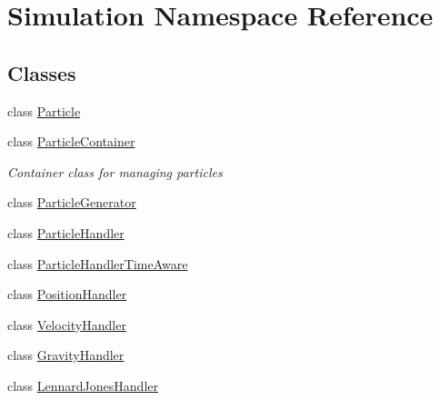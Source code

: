 \hypertarget{namespaceSimulation}{\section{Simulation Namespace Reference}
\label{namespaceSimulation}
}
\subsection*{Classes}
\begin{DoxyCompactItemize}
\item 
class \hyperlink{classSimulation_1_1Particle}{Particle}
\item 
class \hyperlink{classSimulation_1_1ParticleContainer}{Particle\-Container}
\begin{DoxyCompactList}\small\item\em Container class for managing particles \end{DoxyCompactList}\item 
class \hyperlink{classSimulation_1_1ParticleGenerator}{Particle\-Generator}
\item 
class \hyperlink{classSimulation_1_1ParticleHandler}{Particle\-Handler}
\item 
class \hyperlink{classSimulation_1_1ParticleHandlerTimeAware}{Particle\-Handler\-Time\-Aware}
\item 
class \hyperlink{classSimulation_1_1PositionHandler}{Position\-Handler}
\item 
class \hyperlink{classSimulation_1_1VelocityHandler}{Velocity\-Handler}
\item 
class \hyperlink{classSimulation_1_1GravityHandler}{Gravity\-Handler}
\item 
class \hyperlink{classSimulation_1_1LennardJonesHandler}{Lennard\-Jones\-Handler}
\end{DoxyCompactItemize}
